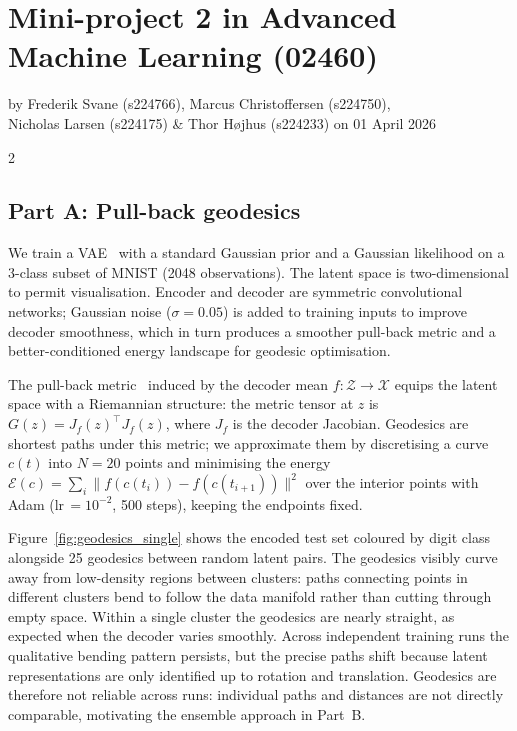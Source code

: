 \documentclass[10pt,a4paper]{article}
\begin{document}

\section*{Mini-project 2 in Advanced Machine Learning (02460)}
by Frederik Svane (s224766), Marcus Christoffersen (s224750), \\
Nicholas Larsen (s224175) \& Thor H{\o}jhus (s224233) on 01 April 2026

\begin{multicols}{2}

\subsection*{Part A: Pull-back geodesics}

We train a VAE~\citep{kingma2013vae} with a standard Gaussian prior
and a Gaussian likelihood on a 3-class subset of MNIST (2048
observations). The latent space is two-dimensional to permit
visualisation. Encoder and decoder are symmetric convolutional
networks; Gaussian noise ($\sigma\!=\!0.05$) is added to training
inputs to improve decoder smoothness, which in turn produces a
smoother pull-back metric and a better-conditioned energy landscape
for geodesic optimisation.

The pull-back metric~\citep{arvanitidis2018latent} induced by the
decoder mean $f\colon\mathcal{Z}\to\mathcal{X}$ equips the latent
space with a Riemannian structure: the metric tensor at $z$ is
$G(z) = J_f(z)^\top J_f(z)$, where $J_f$ is the decoder Jacobian.
Geodesics are shortest paths under this metric; we approximate
them by discretising a curve $c(t)$ into $N\!=\!20$ points and
minimising the energy
$\mathcal{E}(c) = \sum_{i} \lVert f(c(t_i)) - f(c(t_{i+1})) \rVert^2$
over the interior points with Adam (lr\,$=10^{-2}$, 500 steps),
keeping the endpoints fixed.

Figure~\ref{fig:geodesics_single} shows the encoded test set coloured by
digit class alongside 25 geodesics between random latent pairs.
The geodesics visibly curve away from low-density regions between
clusters: paths connecting points in different clusters bend to
follow the data manifold rather than cutting through empty space.
Within a single cluster the geodesics are nearly straight, as
expected when the decoder varies smoothly.
Across independent training runs the qualitative bending pattern
persists, but the precise paths shift because latent
representations are only identified up to rotation and
translation. Geodesics are therefore not reliable across runs:
individual paths and distances are not directly comparable,
motivating the ensemble approach in Part~B.


\end{multicols}
\end{document}
